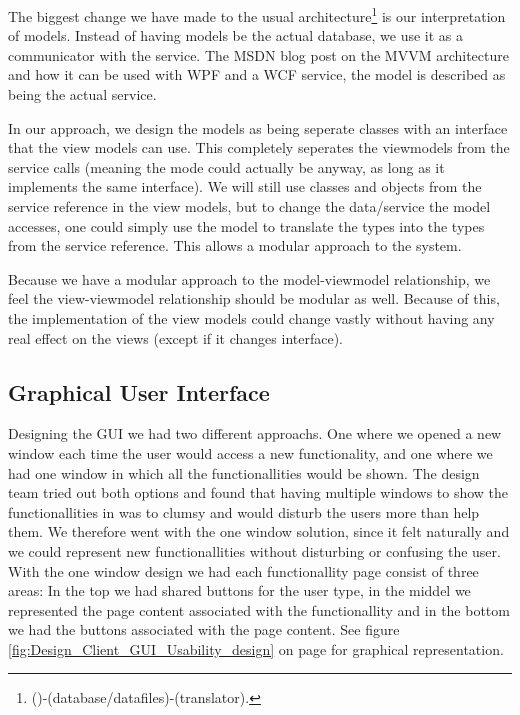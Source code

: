 The biggest change we have made to the usual architecture\footnote{()-(database/datafiles)-(translator).} is our interpretation of models. Instead of having models be the actual database, we use it as a communicator with the service. The MSDN blog post on the MVVM architecture \cite{MSDN-WPF-MVVM} and how it can be used with WPF and a WCF service, the model is described as being the actual service. 

In our approach, we design the models as being seperate classes with an interface that the view models can use. This completely seperates the viewmodels from the service calls (meaning the mode could actually be anyway, as long as it implements the same interface). We will still use classes and objects from the service reference in the view models, but to change the data/service the model accesses, one could simply use the model to translate the types into the types from the service reference. This allows a modular approach to the system.

Because we have a modular approach to the model-viewmodel relationship, we feel the view-viewmodel relationship should be modular as well. Because of this, the implementation of the view models could change vastly without having any real effect on the views (except if it changes interface).
\subsection{Graphical User Interface}
\label{Design_Client_GUI}
Designing the GUI we had two different approachs. One where we opened a new window each time the user would access a new functionality, and one where we had one window in which all the functionallities would be shown. The design team tried out both options and found that having multiple windows to show the functionallities in was to clumsy and would disturb the users more than help them. We therefore went with the one window solution,  since it felt naturally and we could represent new functionallities without disturbing or confusing the user. With the one window design we had each functionallity page consist of three areas: In the top we had shared buttons for the user type, in the middel we represented the page content associated with the functionallity and in the bottom we had the buttons associated with the page content. See figure \ref{fig:Design_Client_GUI_Usability_design} on page \pageref{fig:Design_Client_GUI_Usability_design} for graphical representation.

